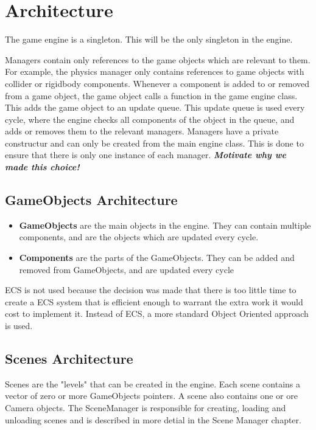 \section{Architecture}
The game engine is a singleton. This will be the only singleton in the engine.

Managers contain only references to the game objects which are relevant to them. For example, the physics manager only contains references to game objects with collider or rigidbody components.
Whenever a component is added to or removed from a game object, the game object calls a function in the game engine class. This adds the game object to an update queue. This update queue is used every cycle, where the engine checks all components of the object in the queue, and adds or removes them to the relevant managers.
Managers have a private constructur and can only be created from the main engine class. This is done to ensure that there is only one instance of each manager.
\textbf{\textit{Motivate why we made this choice!}}

\subsection{GameObjects Architecture}
\begin{itemize}
    \item \textbf{GameObjects} are the main objects in the engine. They can contain multiple components, and are the objects which are updated every cycle.
    \item \textbf{Components} are the parts of the GameObjects. They can be added and removed from GameObjects, and are updated every cycle
\end{itemize}
ECS is not used because the decision was made that there is too little time to create a ECS system that is efficient enough to warrant the extra work it would cost to implement it.
Instead of ECS, a more standard Object Oriented approach is used.

\subsection{Scenes Architecture}
Scenes are the "levels" that can be created in the engine. Each scene contains a vector of zero or more GameObjects pointers. 
A scene also contains one or ore Camera objects. 
The SceneManager is responsible for creating, loading and unloading scenes and is described in more detial in the Scene Manager chapter.













